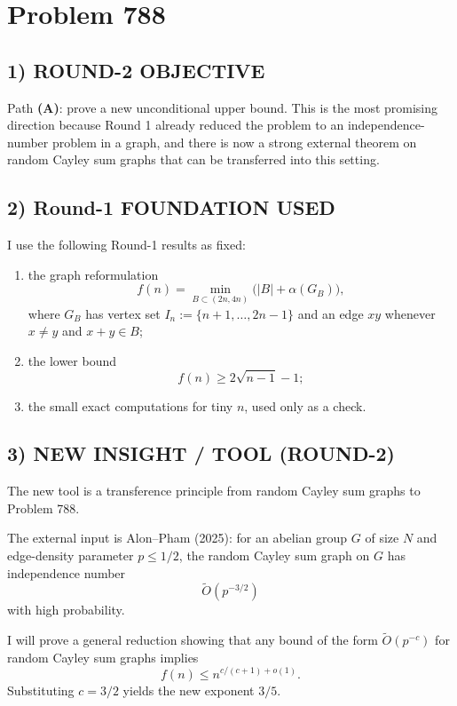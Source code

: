 \section{Problem 788}

\subsection*{1) ROUND-2 OBJECTIVE}
Path \textbf{(A)}: prove a new unconditional upper bound. This is the most promising direction because Round 1 already reduced the problem to an independence-number problem in a graph, and there is now a strong external theorem on random Cayley sum graphs that can be transferred into this setting.

\subsection*{2) Round-1 FOUNDATION USED}
I use the following Round-1 results as fixed:
\begin{enumerate}
\item the graph reformulation
\[
 f(n)=\min_{B \subset (2n,4n)} \bigl(|B|+\alpha(G_B)\bigr),
\]
where $G_B$ has vertex set $I_n:=\{n+1,\dots,2n-1\}$ and an edge $xy$ whenever $x\neq y$ and $x+y \in B$;
\item the lower bound
\[
 f(n) \ge 2\sqrt{n-1}-1;
\]
\item the small exact computations for tiny $n$, used only as a check.
\end{enumerate}

\subsection*{3) NEW INSIGHT / TOOL (ROUND-2)}
The new tool is a transference principle from random Cayley sum graphs to Problem 788.

The external input is Alon--Pham (2025): for an abelian group $G$ of size $N$ and edge-density parameter $p \le 1/2$, the random Cayley sum graph on $G$ has independence number
\[
 \widetilde O(p^{-3/2})
\]
with high probability.

I will prove a general reduction showing that any bound of the form $\widetilde O(p^{-c})$ for random Cayley sum graphs implies
\[
 f(n) \le n^{c/(c+1)+o(1)}.
\]
Substituting $c=3/2$ yields the new exponent $3/5$.

